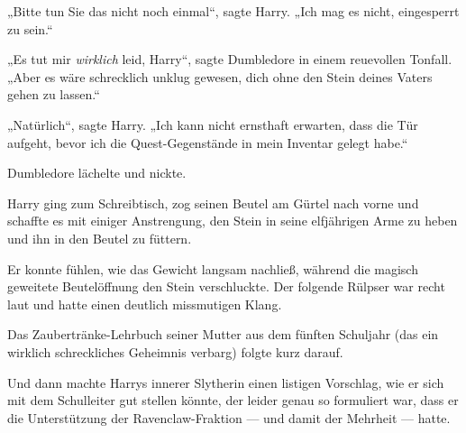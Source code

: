 „Bitte tun Sie das nicht noch einmal“, sagte Harry.
„Ich mag es nicht, eingesperrt zu sein.“

„Es tut mir \emph{wirklich} leid, Harry“, sagte Dumbledore in einem reuevollen Tonfall.
„Aber es wäre schrecklich unklug gewesen, dich ohne den Stein deines Vaters gehen zu lassen.“

„Natürlich“, sagte Harry.
„Ich kann nicht ernsthaft erwarten, dass die Tür aufgeht, bevor ich die Quest-Gegenstände in mein Inventar gelegt habe.“

Dumbledore lächelte und nickte.

Harry ging zum Schreibtisch, zog seinen Beutel am Gürtel nach vorne und schaffte es mit einiger Anstrengung, den Stein in seine elfjährigen Arme zu heben und ihn in den Beutel zu füttern.

Er konnte fühlen, wie das Gewicht langsam nachließ, während die magisch geweitete Beutelöffnung den Stein verschluckte. Der folgende Rülpser war recht laut und hatte einen deutlich missmutigen Klang.

Das Zaubertränke-Lehrbuch seiner Mutter aus dem fünften Schuljahr (das ein wirklich schreckliches Geheimnis verbarg) folgte kurz darauf.

Und dann machte Harrys innerer Slytherin einen listigen Vorschlag, wie er sich mit dem Schulleiter gut stellen könnte, der leider genau so formuliert war, dass er die Unterstützung der Ravenclaw-Fraktion — und damit der Mehrheit — hatte.

